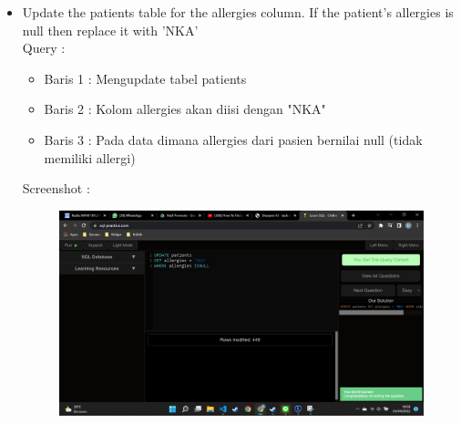 \documentclass[]{article}
\begin{document}
\begin{itemize}
        \item Update the patients table for the allergies column. If the patient's allergies is null then replace it with 'NKA'
        \\Query :
        
        \begin{itemize}
            \item Baris 1 : Mengupdate tabel patients
            \item Baris 2 : Kolom allergies akan diisi dengan "NKA"
            \item Baris 3 : Pada data dimana allergies dari pasien bernilai null (tidak memiliki allergi)
        \end{itemize}
        Screenshot :
        \begin{figure}[h]
            \includegraphics[scale=0.3]{./Screenshot/Easy-5.png}
            \centering
        \end{figure}


\end{itemize}
\end{document}
